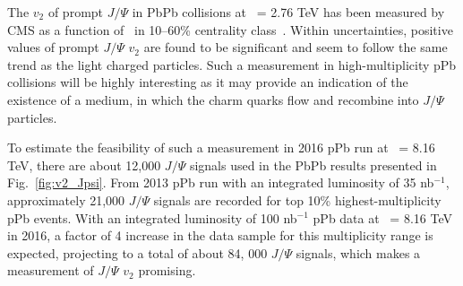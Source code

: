 The $v_2$ of prompt $J/\Psi$ in PbPb collisions at \rootsNN\ = 2.76 TeV has been measured by CMS
as a function of \pt\ in 10--60\% centrality class~\cite{CMS-PAS-HIN-12-001}. Within uncertainties,
positive values of prompt $J/\Psi$ $v_2$ are found to be significant and seem to follow the same trend
as the light charged particles. Such a measurement in high-multiplicity pPb collisions will be highly interesting as it may provide an indication of the existence of a medium, in which the charm quarks flow and
recombine into $J/\Psi$ particles. 

To estimate the feasibility of such a measurement in 2016 pPb run at \rootsNN\ = 8.16 TeV, 
there are about 12,000 $J/\Psi$ signals used in the PbPb results presented in Fig.~\ref{fig:v2_Jpsi}.
From 2013 pPb run with an integrated luminosity of 35 nb$^{-1}$, approximately 21,000 $J/\Psi$ signals
are recorded for top 10\% highest-multiplicity pPb events. With an integrated luminosity of 100 nb$^{-1}$
pPb data at \rootsNN\ = 8.16 TeV in 2016, a factor of 4 increase in the data sample 
for this multiplicity range is expected, projecting to a total of about 84, 000 $J/\Psi$ signals, which
makes a measurement of $J/\Psi$ $v_2$ promising.